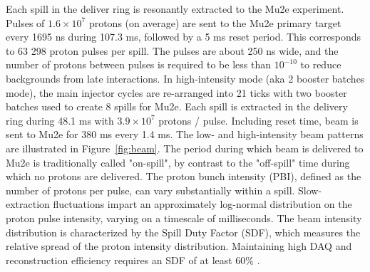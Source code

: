 Each spill in the deliver ring is resonantly extracted to the Mu2e experiment. Pulses of $1.6\times 10^{7}$ protons (on average) are sent to the Mu2e primary target every 1695 ns during 107.3 ms, followed by a 5 ms reset period. This corresponds to 63 298 proton pulses per spill. The pulses are about 250 ns wide, and the number of protons between pulses is required to be less than $10^{-10}$ \cite{beamreqs} to reduce backgrounds from late interactions. In high-intensity mode (aka 2 booster batches mode), the main injector cycles are re-arranged into 21 ticks with two booster batches used to create 8 spills for Mu2e. Each spill is extracted in the delivery ring during 48.1 ms with $3.9\times 10^{7}$ protons / pulse. Including reset time, beam is sent to Mu2e for 380 ms every 1.4 ms. The low- and high-intensity beam patterns are illustrated in Figure~\ref{fig:beam}. The period during which beam is delivered to Mu2e is traditionally called "on-spill", by contrast to the "off-spill" time during which no protons are delivered. The proton bunch intensity (PBI), defined as the number of protons per pulse, can vary substantially within a spill. Slow-extraction fluctuations impart an approximately log-normal distribution on the proton pulse intensity, varying on a timescale of milliseconds. The beam intensity distribution is characterized by the Spill Duty Factor (SDF), which measures the relative spread of the proton intensity distribution. Maintaining high DAQ and reconstruction efficiency requires an SDF of at least 60\% \cite{beamreqs}.


